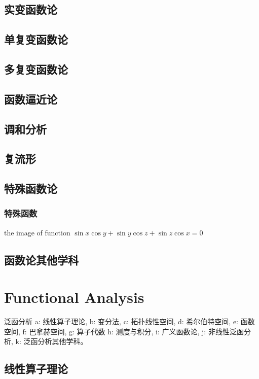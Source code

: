 \documentclass[UTF8]{../09-Mathematics}
\begin{document}
\section{实变函数论}
\section{单复变函数论}
\section{多复变函数论}
\section{函数逼近论}
\section{调和分析}
\section{复流形}
\section{特殊函数论}

\subsection{特殊函数}

the image of function 
$\sin x \cos y + \sin y \cos z + \sin z \cos x = 0$



\section{函数论其他学科}




\chapter{Functional Analysis}

泛函分析
a: 线性算子理论, 
b: 变分法, 
c: 拓扑线性空间, 
d: 希尔伯特空间, 
e: 函数空间, 
f: 巴拿赫空间, 
g: 算子代数 
h: 测度与积分, 
i: 广义函数论, 
j: 非线性泛函分析, 
k: 泛函分析其他学科。


\section{线性算子理论}
\end{document}
